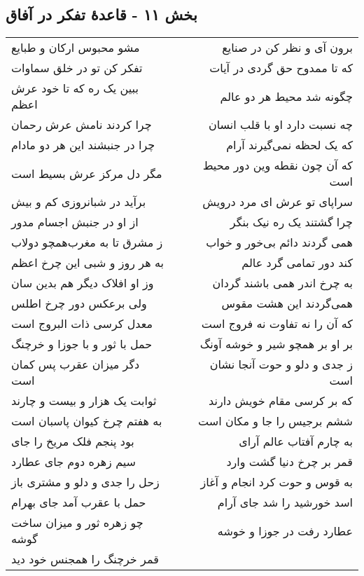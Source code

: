 \begin{center}
\section*{بخش ۱۱ - قاعدهٔ تفکر در آفاق}
\label{sec:sh011}
\begin{longtable}{l p{0.5cm} r}
مشو محبوس ارکان و طبایع
&&
برون آی و نظر کن در صنایع
\\
تفکر کن تو در خلق سماوات
&&
که تا ممدوح حق گردی در آیات
\\
ببین یک ره که تا خود عرش اعظم
&&
چگونه شد محیط هر دو عالم
\\
چرا کردند نامش عرش رحمان
&&
چه نسبت دارد او با قلب انسان
\\
چرا در جنبشند این هر دو مادام
&&
که یک لحظه نمی‌گیرند آرام
\\
مگر دل مرکز عرش بسیط است
&&
که آن چون نقطه وین دور محیط است
\\
برآید در شبانروزی کم و بیش
&&
سراپای تو عرش ای مرد درویش
\\
از او در جنبش اجسام مدور
&&
چرا گشتند یک ره نیک بنگر
\\
ز مشرق تا به مغرب‌همچو دولاب
&&
همی گردند دائم بی‌خور و خواب
\\
به هر روز و شبی این چرخ اعظم
&&
کند دور تمامی گرد عالم
\\
وز او افلاک دیگر هم بدین سان
&&
به چرخ اندر همی باشند گردان
\\
ولی برعکس دور چرخ اطلس
&&
همی‌گردند این هشت مقوس
\\
معدل کرسی ذات البروج است
&&
که آن را نه تفاوت نه فروج است
\\
حمل با ثور و با جوزا و خرچنگ
&&
بر او بر همچو شیر و خوشه آونگ
\\
دگر میزان عقرب پس کمان است
&&
ز جدی و دلو و حوت آنجا نشان است
\\
ثوابت یک هزار و بیست و چارند
&&
که بر کرسی مقام خویش دارند
\\
به هفتم چرخ کیوان پاسبان است
&&
ششم برجیس را جا و مکان است
\\
بود پنجم فلک مریخ را جای
&&
به چارم آفتاب عالم آرای
\\
سیم زهره دوم جای عطارد
&&
قمر بر چرخ دنیا گشت وارد
\\
زحل را جدی و دلو و مشتری باز
&&
به قوس و حوت کرد انجام و آغاز
\\
حمل با عقرب آمد جای بهرام
&&
اسد خورشید را شد جای آرام
\\
چو زهره ثور و میزان ساخت گوشه
&&
عطارد رفت در جوزا و خوشه
\\
قمر خرچنگ را همجنس خود دید

\end{longtable}
\end{center}
